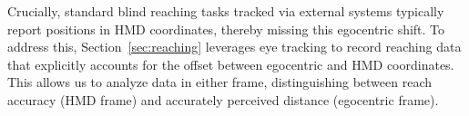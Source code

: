 Crucially, standard blind reaching tasks tracked via external systems typically report positions in HMD coordinates, thereby missing this egocentric shift. To address this, Section~\ref{sec:reaching} leverages eye tracking to record reaching data that explicitly accounts for the offset between egocentric and HMD coordinates. This allows us to analyze data in either frame, distinguishing between reach accuracy (HMD frame) and accurately perceived distance (egocentric frame).





